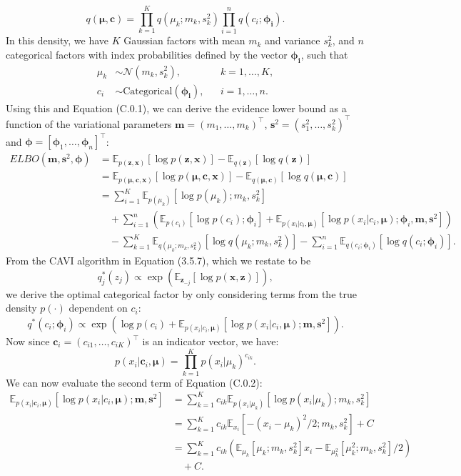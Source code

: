 \documentclass[honours,12pt, twoside]{unswthesis}
\newcommand{\E}{\mathbb{E}}
\numberwithin{equation}{section}
\theoremstyle{definition}
\begin{document}
\[q(\bm{\mu},\bm{c})=\prod^K_{k=1}q(\mu_k;m_k,s^2_k)\prod^n_{i=1}q(c_i;\bm{\phi_i}).\]
In this density, we have $K$ Gaussian factors with mean $m_k$ and variance $s^2_k$, and $n$ categorical factors with index probabilities defined by the vector $\bm{\phi_i}$, such that
\begin{align*}
\mu_k&\sim \mathcal{N}(m_k,s^2_k), &&k=1,\dots,K,\\
c_i&\sim \text{Categorical}(\bm{\phi_i}), &&i=1,\dots,n.
\end{align*}
Using this and Equation (C.0.1), we can derive the evidence lower bound as a function of the variational parameters $\bm{m}=(m_1,\dots,m_k)^\top$, $\bm{s}^2=(s_1^2,\dots,s_k^2)^\top$ and $\bm{\phi}=[\bm{\phi}_1,\dots,\bm{\phi}_n]^\top$:
\begin{align*}
ELBO(\bm{m},\bm{s}^2,\bm{\phi})&=\mathbb{E}_{p(\textbf{z},\bm{x})}[\log p(\textbf{z},\bm{x})]-\mathbb{E}_{q(\bm{z})}[\log q(\bm{z})]\\
&=\mathbb{E}_{p(\bm{\mu,c},\textbf{x})}[\log p(\bm{\mu,c},\textbf{x})]-\mathbb{E}_{q(\bm{\mu,c})}[\log q(\bm{\mu,c})]\\
&=\sum^K_{i=1}\mathbb{E}_{p(\mu_k)}[\log p(\mu_k); m_k,s^2_k]\\
&\quad +\sum^n_{i=1}\left(\mathbb{E}_{p(c_i)}[\log p(c_i);\bm{\phi}_i]+\mathbb{E}_{p(x_i|c_i,\bm{\mu})}[\log p(x_i|c_i,\bm{\mu});\bm{\phi}_i,\bm{m},\bm{s}^2]\right)\\
&\quad -\sum^K_{k=1}\mathbb{E}_{q(\mu_k;m_k,s^2_k)}[\log q(\mu_k;m_k,s^2_k)]-\sum^n_{i=1}\mathbb{E}_{q(c_i;\bm{\phi}_i)}[\log q(c_i;\bm{\phi}_i)].
\end{align*}
From the CAVI algorithm in Equation (3.5.7), which we restate to be \[q^*_j(z_j)\propto \exp \left(\E_{\bm{z}_{-j}}[\log p(\bm{x},\bm{z})]\right),\]we derive the optimal categorical factor by only considering terms from the true density $p(\cdot)$ dependent on $c_i$:
\begin{equation}
q^*(c_i;\bm{\phi}_i)\propto \exp\left(\log p(c_i)+\mathbb{E}_{p(x_i|c_i,\bm{\mu})}[\log p(x_i|c_i,\bm{\mu});\bm{m},\bm{s}^2]\right).
\end{equation}
Now since $\bm{c}_i=(c_{i1},\dots,c_{iK})^\top$ is an indicator vector, we have:
\[p(x_i|\bm{c}_i,\bm{\mu})=\prod^K_{k=1}p(x_i|\mu_k)^{c_{ik}}.\]
We can now evaluate the second term of Equation (C.0.2):
\begin{align*}
\mathbb{E}_{p(x_i|\bm{c}_i,\bm{\mu})}\left[\log p(x_i|c_i,\bm{\mu});\bm{m},\bm{s}^2\right]&=\sum_{k=1}^K c_{ik}\mathbb{E}_{p(x_i|\mu_k)}[\log p(x_i|\mu_k);m_k,s^2_k]\\
&=\sum_{k=1}^K c_{ik}\mathbb{E}_{x_i}[-(x_i-\mu_k)^2/2;m_k,s^2_k]+C\\
&=\sum_{k=1}^Kc_{ik}\left(\mathbb{E}_{\mu_k}[\mu_k;m_k,s^2_k]x_i-\mathbb{E}_{\mu_k^2}[\mu^2_k;m_k,s^2_k]/2\right)\\
&\quad +C.
\end{align*}
\end{document}
